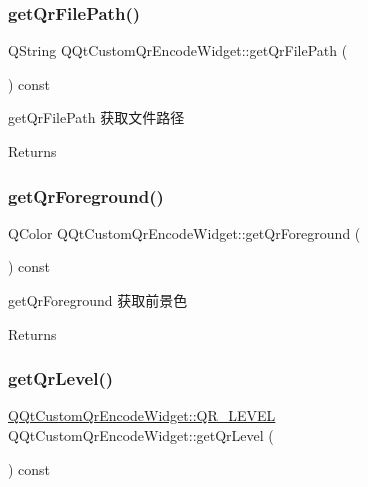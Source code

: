 \subsubsection{\texorpdfstring{get\+Qr\+File\+Path()}{getQrFilePath()}}
{\footnotesize\ttfamily Q\+String Q\+Qt\+Custom\+Qr\+Encode\+Widget\+::get\+Qr\+File\+Path (\begin{DoxyParamCaption}{ }\end{DoxyParamCaption}) const}



get\+Qr\+File\+Path 获取文件路径 

\begin{DoxyReturn}{Returns}

\end{DoxyReturn}
\mbox{\label{class_q_qt_custom_qr_encode_widget_afd01ff570a95925461638e32da50114a}} 
\subsubsection{\texorpdfstring{get\+Qr\+Foreground()}{getQrForeground()}}
{\footnotesize\ttfamily Q\+Color Q\+Qt\+Custom\+Qr\+Encode\+Widget\+::get\+Qr\+Foreground (\begin{DoxyParamCaption}{ }\end{DoxyParamCaption}) const}



get\+Qr\+Foreground 获取前景色 

\begin{DoxyReturn}{Returns}

\end{DoxyReturn}
\mbox{\label{class_q_qt_custom_qr_encode_widget_a1de7f57bb6519b51dc68916c8f229532}} 
\subsubsection{\texorpdfstring{get\+Qr\+Level()}{getQrLevel()}}
{\footnotesize\ttfamily \mbox{\hyperlink{class_q_qt_custom_qr_encode_widget_a6107aaf68178d54d1274f0afc2ec310b}{Q\+Qt\+Custom\+Qr\+Encode\+Widget\+::\+Q\+R\+\_\+\+L\+E\+V\+EL}} Q\+Qt\+Custom\+Qr\+Encode\+Widget\+::get\+Qr\+Level (\begin{DoxyParamCaption}{ }\end{DoxyParamCaption}) const}



